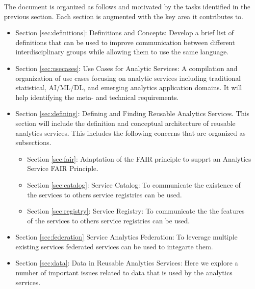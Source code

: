 The document is organized as follows and motivated by the tasks
identified in the previous section. Each section is augmented with the
key area it contributes to.

\begin{itemize}
  
\item Section \ref{sec:definitions}: Definitions and Concepts: Develop
  a brief list of definitions that can be used to improve
  communication between different interdisciplinary groups while
  allowing them to use the same language.

\item Section \ref{sec:usecases}: Use Cases for Analytic Services:
  A compilation and organization of use cases focusing on analytic
  services including traditional statistical, AI/ML/DL, and emerging
  analytics application domains. It will help identifying the meta-
  and technical requirements.

\item Section \ref{sec:defining}: Defining and Finding Reusable Analytics
  Services. This section 
  will include the definition and conceptual architecture of reusable
  analytics services. This includes the following concerns that are
  organized as subsections.

 \begin{itemize}
 
    \item Section \ref{sec:fair}: Adaptation of the FAIR principle to
       supprt an Analytics Service FAIR Principle.

    \item Section \ref{sec:catalog}: Service Catalog: To communicate
      the existence of the services to others service registries can
      be used.

    \item Section \ref{sec:registry}: Service Registry: To communicate
      the the features of the services to others service registries
      can be used.

\end{itemize}

\item Section \ref{sec:federation} Service Analytics Federation: To leverage multiple
existing services federated services can be used to integarte them.

\item Section \ref{sec:data}: Data in Reusable Analytics Services:
  Here we explore a number of important issues related to data that is
  used by the analytics services.


\end{itemize}

